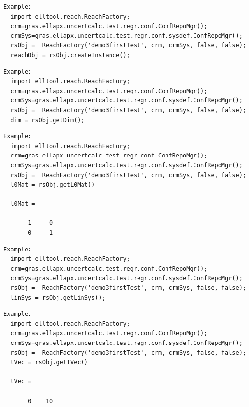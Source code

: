 \documentclass[letterpaper,10pt,english]{sphinxmanual}
\begin{document}
\begin{Verbatim}[commandchars=\\\{\}]
Example:
  import elltool.reach.ReachFactory;
  crm=gras.ellapx.uncertcalc.test.regr.conf.ConfRepoMgr();
  crmSys=gras.ellapx.uncertcalc.test.regr.conf.sysdef.ConfRepoMgr();
  rsObj =  ReachFactory('demo3firstTest', crm, crmSys, false, false);
  reachObj = rsObj.createInstance();
\end{Verbatim}

\begin{Verbatim}[commandchars=\\\{\}]
Example:
  import elltool.reach.ReachFactory;
  crm=gras.ellapx.uncertcalc.test.regr.conf.ConfRepoMgr();
  crmSys=gras.ellapx.uncertcalc.test.regr.conf.sysdef.ConfRepoMgr();
  rsObj =  ReachFactory('demo3firstTest', crm, crmSys, false, false);
  dim = rsObj.getDim();
\end{Verbatim}

\begin{Verbatim}[commandchars=\\\{\}]
Example:
  import elltool.reach.ReachFactory;
  crm=gras.ellapx.uncertcalc.test.regr.conf.ConfRepoMgr();
  crmSys=gras.ellapx.uncertcalc.test.regr.conf.sysdef.ConfRepoMgr();
  rsObj =  ReachFactory('demo3firstTest', crm, crmSys, false, false);
  l0Mat = rsObj.getL0Mat()

  l0Mat =

       1     0
       0     1
\end{Verbatim}

\begin{Verbatim}[commandchars=\\\{\}]
Example:
  import elltool.reach.ReachFactory;
  crm=gras.ellapx.uncertcalc.test.regr.conf.ConfRepoMgr();
  crmSys=gras.ellapx.uncertcalc.test.regr.conf.sysdef.ConfRepoMgr();
  rsObj =  ReachFactory('demo3firstTest', crm, crmSys, false, false);
  linSys = rsObj.getLinSys();
\end{Verbatim}

\begin{Verbatim}[commandchars=\\\{\}]
Example:
  import elltool.reach.ReachFactory;
  crm=gras.ellapx.uncertcalc.test.regr.conf.ConfRepoMgr();
  crmSys=gras.ellapx.uncertcalc.test.regr.conf.sysdef.ConfRepoMgr();
  rsObj =  ReachFactory('demo3firstTest', crm, crmSys, false, false);
  tVec = rsObj.getTVec()

  tVec =

       0    10
\end{Verbatim}
\end{document}

